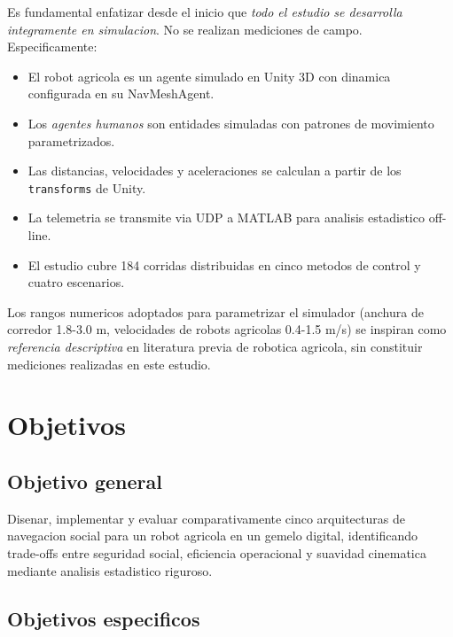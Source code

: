 \documentclass[12pt,a4paper,oneside]{book}
\begin{document}
Es fundamental enfatizar desde el inicio que \emph{todo el estudio se desarrolla integramente en simulacion}. No se realizan mediciones de campo. Especificamente:

\begin{itemize}
    \item El robot agricola es un agente simulado en Unity 3D con dinamica configurada en su NavMeshAgent.
    \item Los \emph{agentes humanos} son entidades simuladas con patrones de movimiento parametrizados.
    \item Las distancias, velocidades y aceleraciones se calculan a partir de los \texttt{transforms} de Unity.
    \item La telemetria se transmite via UDP a MATLAB para analisis estadistico off-line.
    \item El estudio cubre 184 corridas distribuidas en cinco metodos de control y cuatro escenarios.
\end{itemize}

Los rangos numericos adoptados para parametrizar el simulador (anchura de corredor 1.8-3.0 m, velocidades de robots agricolas 0.4-1.5 m/s) se inspiran como \emph{referencia descriptiva} en literatura previa de robotica agricola, sin constituir mediciones realizadas en este estudio.

\section{Objetivos}

\subsection{Objetivo general}

Disenar, implementar y evaluar comparativamente cinco arquitecturas de navegacion social para un robot agricola en un gemelo digital, identificando trade-offs entre seguridad social, eficiencia operacional y suavidad cinematica mediante analisis estadistico riguroso.

\subsection{Objetivos especificos}
\end{document}
